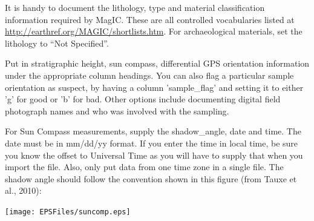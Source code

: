 \documentclass[11pt]{book}
\begin{document}
{{%

   It is handy  to document the lithology, type and material classification information required by MagIC. These  are all controlled vocabularies listed at \url{http://earthref.org/MAGIC/shortlists.htm}.   For archaeological materials, set the lithology to ``Not Specified''.

   Put in stratigraphic height, sun compass, differential GPS orientation information under the appropriate column headings.  You can also flag a particular sample orientation as suspect, by having a column 'sample\_flag' and setting it to either 'g' for good or 'b' for bad.  Other options include documenting digital field photograph names and who was involved with the sampling.

 For Sun Compass measurements, supply the shadow\_angle, date and time. The date must be in mm/dd/yy format. If you enter the time in local time, be sure you know the offset to Universal Time as you will have to supply that when you import the file. Also, only put data from one time zone in a single file. The shadow angle should follow the convention shown in this figure (from Tauxe et al., 2010): \nocite{tauxe10}

  \texttt{[image: EPSFiles/suncomp.eps]}


}}
\end{document}

